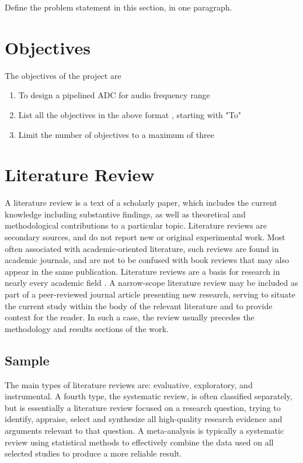 Define the problem statement in this section, in one paragraph.

\section[Objectives]{\textbf{Objectives}}
The objectives of the project are
\begin{enumerate}
\item To design a pipelined ADC for audio frequency range
\item List all the objectives in the above format , starting with "To"
\item Limit the number of objectives to a maximum of three
\end{enumerate}

\section[Literature Review]{\textbf{Literature Review}}

A literature review is a text of a scholarly paper, which includes the current knowledge including substantive findings, as well as theoretical and methodological contributions to a particular topic. Literature reviews are secondary sources, and do not report new or original experimental work. Most often associated with academic-oriented literature, such reviews are found in academic journals, and are not to be confused with book reviews that may also appear in the same publication. Literature reviews are a basis for research in nearly every academic field . A narrow-scope literature review may be included as part of a peer-reviewed journal article presenting new research, serving to situate the current study within the body of the relevant literature and to provide context for the reader. In such a case, the review usually precedes the methodology and results sections of the work.

\subsection{Sample}
The main types of literature reviews are: evaluative, exploratory, and instrumental. A fourth type, the systematic review, is often classified separately, but is essentially a literature review focused on a research question, trying to identify, appraise, select and synthesize all high-quality research evidence and arguments relevant to that question. A meta-analysis is typically a systematic review using statistical methods to effectively combine the data used on all selected studies to produce a more reliable result.
